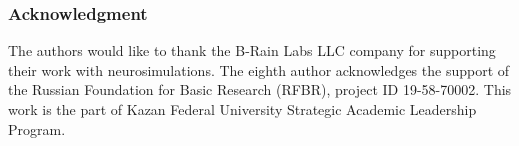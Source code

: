 \documentclass[12pt, aspectratio=169]{beamer}
\begin{document}
\begin{frame}
  \frametitle{Acknowledgment}
The authors would like to thank the B-Rain Labs LLC company for supporting their work with neurosimulations. The eighth author acknowledges the support of the Russian Foundation for Basic Research (RFBR), project ID 19-58-70002. 
This work is the part of Kazan Federal University Strategic Academic Leadership Program. 

\end{frame}
\end{document}
